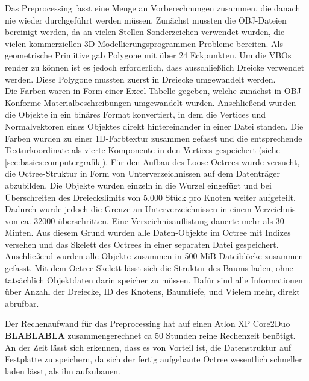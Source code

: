 Das Preprocessing fasst eine Menge an Vorberechnungen zusammen, die danach nie wieder durchgeführt werden müssen. Zunächst mussten die OBJ-Dateien bereinigt werden, da an vielen Stellen Sonderzeichen verwendet wurden, die vielen kommerziellen 3D-Modellierungsprogrammen Probleme bereiten. Als geometrische Primitive gab Polygone mit über 24 Eckpunkten. Um die VBOs render zu können ist es jedoch erforderlich, dass ausschließlich Dreicke verwendet werden. Diese Polygone mussten zuerst in Dreiecke umgewandelt werden. \\
Die Farben waren in Form einer Excel-Tabelle gegeben, welche zunächst in OBJ-Konforme Materialbeschreibungen umgewandelt wurden. Anschließend wurden die Objekte in ein binäres Format konvertiert, in dem die Vertices und Normalvektoren eines Objektes direkt hintereinander in einer Datei standen. Die Farben wurden zu einer 1D-Farbtextur zusammen gefasst und die entsprechende Texturkoordinate als vierte Komponente in den Vertices gespeichert (siehe \ref{sec:basics:computergrafik}). Für den Aufbau des Loose Octrees wurde versucht, die Octree-Struktur in Form von Unterverzeichnissen auf dem Datenträger abzubilden. Die Objekte wurden einzeln in die Wurzel eingefügt und bei Überschreiten des Dreieckslimits von 5.000 Stück pro Knoten weiter aufgeteilt. Dadurch wurde jedoch die Grenze an Unterverzeichnissen in einem Verzeichnis von ca. 32000 überschritten. Eine Verzeichnisauflistung dauerte mehr als 30 Minten. Aus diesem Grund wurden alle Daten-Objekte im Octree mit Indizes versehen und das Skelett des Octrees in einer separaten Datei gespeichert. Anschließend wurden alle Objekte zusammen in 500 MiB Dateiblöcke zusammen gefasst. Mit dem Octree-Skelett lässt sich die Struktur des Baums laden, ohne tatsächlich Objektdaten darin speicher zu müssen. Dafür sind alle Informationen über Anzahl der Dreiecke, ID des Knotens, Baumtiefe, und Vielem mehr, direkt abrufbar.

Der Rechenaufwand für das Preprocessing hat auf einen Atlon XP Core2Duo \textbf{BLABLABLA} zusammengerechnet ca 50 Stunden reine Rechenzeit benötigt. An der Zeit lässt sich erkennen, dass es von Vorteil ist, die Datenstruktur auf Festplatte zu speichern, da sich der fertig aufgebaute Octree wesentlich schneller laden lässt, als ihn aufzubauen.

